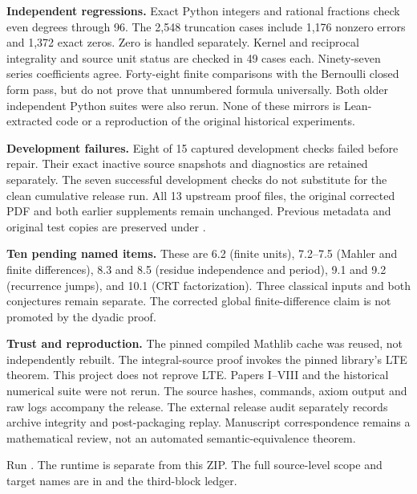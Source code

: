 \textbf{Independent regressions.} Exact Python integers and rational fractions check even degrees through 96. The 2,548 truncation cases include 1,176 nonzero errors and 1,372 exact zeros. Zero is handled separately. Kernel and reciprocal integrality and source unit status are checked in 49 cases each. Ninety-seven series coefficients agree. Forty-eight finite comparisons with the Bernoulli closed form pass, but do not prove that unnumbered formula universally. Both older independent Python suites were also rerun. None of these mirrors is Lean-extracted code or a reproduction of the original historical experiments.

\textbf{Development failures.} Eight of 15 captured development checks failed before repair. Their exact inactive source snapshots and diagnostics are retained separately. The seven successful development checks do not substitute for the clean cumulative release run. All 13 upstream proof files, the original corrected PDF and both earlier supplements remain unchanged. Previous metadata and original test copies are preserved under .

\textbf{Ten pending named items.} These are 6.2 (finite units), 7.2--7.5 (Mahler and finite differences), 8.3 and 8.5 (residue independence and period), 9.1 and 9.2 (recurrence jumps), and 10.1 (CRT factorization). Three classical inputs and both conjectures remain separate. The corrected global finite-difference claim is not promoted by the dyadic proof.

\textbf{Trust and reproduction.} The pinned compiled Mathlib cache was reused, not independently rebuilt. The integral-source proof invokes the pinned library's LTE theorem. This project does not reprove LTE. Papers I--VIII and the historical numerical suite were not rerun. The source hashes, commands, axiom output and raw logs accompany the release. The external release audit separately records archive integrity and post-packaging replay. Manuscript correspondence remains a mathematical review, not an automated semantic-equivalence theorem.

Run . The runtime is separate from this ZIP. The full source-level scope and target names are in  and the third-block ledger.

